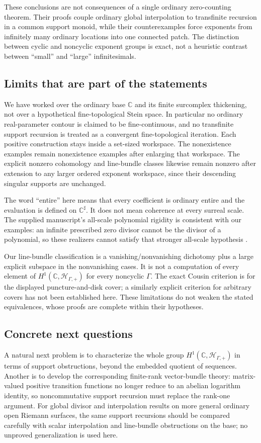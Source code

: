 \documentclass[11pt,letterpaper]{article}
\theoremstyle{definition}
\theoremstyle{remark}
\newcommand{\C}{\mathbb C}
\newcommand{\HP}{\mathscr H_{\Gamma,+}}
\newcommand{\sh}{^{\sharp}}
\numberwithin{equation}{section}
\begin{document}
These conclusions are not consequences of a single ordinary zero-counting theorem. Their proofs couple ordinary global interpolation to transfinite recursion in a common support monoid, while their counterexamples force exponents from infinitely many ordinary locations into one connected patch. The distinction between cyclic and noncyclic exponent groups is exact, not a heuristic contrast between ``small'' and ``large'' infinitesimals.

\subsection{Limits that are part of the statements}
We have worked over the ordinary base $\C$ and its finite surcomplex thickening, not over a hypothetical fine-topological Stein space. In particular no ordinary real-parameter contour is claimed to be fine-continuous, and no transfinite support recursion is treated as a convergent fine-topological iteration. Each positive construction stays inside a set-sized workspace. The nonexistence examples remain nonexistence examples after enlarging that workspace. The explicit nonzero cohomology and line-bundle classes likewise remain nonzero after extension to any larger ordered exponent workspace, since their descending singular supports are unchanged.

The word ``entire'' here means that every coefficient is ordinary entire and the evaluation is defined on $\C\sh$. It does not mean coherence at every surreal scale. The supplied manuscript's all-scale polynomial rigidity is consistent with our examples: an infinite prescribed zero divisor cannot be the divisor of a polynomial, so these realizers cannot satisfy that stronger all-scale hypothesis \cite{Supplied}.

Our line-bundle classification is a vanishing/nonvanishing dichotomy plus a large explicit subspace in the nonvanishing cases. It is not a computation of every element of $H^1(\C,\HP)$ for every noncyclic $\Gamma$. The exact Cousin criterion is for the displayed puncture-and-disk cover; a similarly explicit criterion for arbitrary covers has not been established here. These limitations do not weaken the stated equivalences, whose proofs are complete within their hypotheses.

\subsection{Concrete next questions}
A natural next problem is to characterize the whole group $H^1(\C,\HP)$ in terms of support obstructions, beyond the embedded quotient of sequences. Another is to develop the corresponding finite-rank vector-bundle theory: matrix-valued positive transition functions no longer reduce to an abelian logarithm identity, so noncommutative support recursion must replace the rank-one argument. For global divisor and interpolation results on more general ordinary open Riemann surfaces, the same support recursions should be compared carefully with scalar interpolation and line-bundle obstructions on the base; no unproved generalization is used here.
\end{document}
